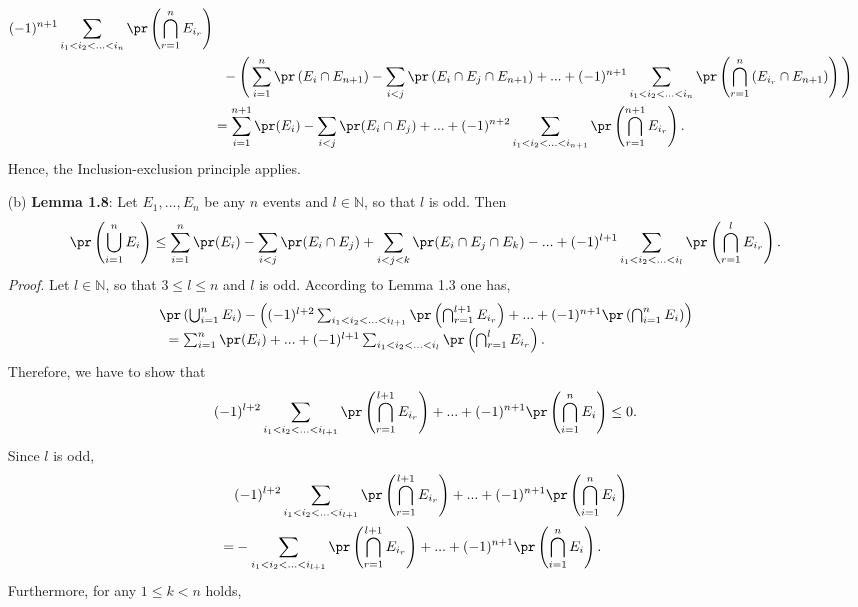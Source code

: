 \begin{enumerate}
\begin{align*}
          (-1)^{n+1} \sum_{i_1<i_2< ... <i_n} \pr\left(\bigcap_{r=1}^n E_{i_r}\right) \\
        &\ \ - \Bigg(
            \sum_{i=1}^n \pr\left(E_i \cap E_{n+1}\right) - \sum_{i<j}\pr\left(E_i
            \cap E_j \cap E_{n+1}\right) + ...
         + (-1)^{n+1} \sum_{i_1<i_2< ... <i_n} \pr\left(\bigcap_{r=1}^n
          \left(E_{i_r} \cap E_{n+1}\right)\right)
          \Bigg) \\
        &= \sum_{i=1}^{n+1} \pr(E_i) - \sum_{i<j}\pr(E_i \cap E_j) +  ... + (-1)^{n+2}
          \sum_{i_1<i_2< ... <i_{n+1}} \pr\left(\bigcap_{r=1}^{n+1}E_{i_r}\right).
    \end{align*}
    Hence, the Inclusion-exclusion principle applies.

  \item[(b)] \textbf{Lemma 1.8}: Let $E_1,...,E_n$ be any $n$ events and $l \in
  \mathbb{N}$, so that $l$ is odd. Then
  \[
    \pr\left(\bigcup_{i=1}^n E_i\right)
    \leq \sum_{i=1}^n \pr(E_i) - \sum_{i<j}\pr(E_i \cap E_j) + \sum_{i<j<k}\pr(E_i \cap E_j \cap E_k) - ... + (-1)^{l+1} \sum_{i_1<i_2< ... <i_l} \pr\left(\bigcap_{r=1}^lE_{i_r}\right).
  \]
  \textit{Proof}. Let $l \in \mathbb{N}$, so that $3 \leq l \leq n$ and $l$ is odd. According to Lemma 1.3 one has,
  \begin{align*}
  \begin{tabular}{l}
    $\pr\left(\bigcup_{i=1}^n E_i\right) -
    \left(
      (-1)^{l+2} \sum_{i_1<i_2< ... <i_{l+1}} \pr\left(\bigcap_{r=1}^{l+1} E_{i_r}\right) + ... +
      (-1)^{n+1} \pr\left(\bigcap_{i=1}^n E_{i}\right)
    \right)$ \\
    $\ \ = \sum_{i=1}^n \pr(E_i) + ... + (-1)^{l+1} \sum_{i_1<i_2< ... <i_l}
      \pr\left(\bigcap_{r=1}^lE_{i_r}\right).$
  \end{tabular}
  \end{align*}
  Therefore, we have to show that
  \[
    (-1)^{l+2} \sum_{i_1<i_2< ... <i_{l+1}} \pr\left(\bigcap_{r=1}^{l+1} E_{i_r}\right)
    + ... + (-1)^{n+1} \pr\left(\bigcap_{i=1}^n E_{i}\right) \leq 0.
  \]
  Since $l$ is odd,
  \begin{align*}
      &(-1)^{l+2} \sum_{i_1<i_2< ... <i_{l+1}} \pr\left(\bigcap_{r=1}^{l+1} E_{i_r}\right) + ... + (-1)^{n+1} \pr\left(\bigcap_{i=1}^n E_{i}\right) \\
    = &-\sum_{i_1<i_2< ... <i_{l+1}} \pr\left(\bigcap_{r=1}^{l+1} E_{i_r}\right)
      + ... + (-1)^{n+1} \pr\left(\bigcap_{i=1}^n E_{i}\right).
  \end{align*}
  Furthermore, for any $1 \leq k < n$ holds,

\end{enumerate}
